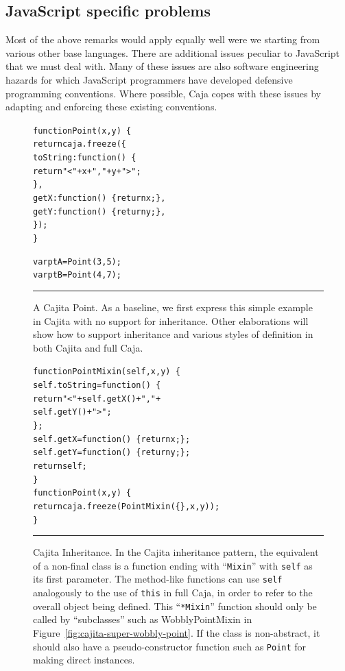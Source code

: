 \documentclass[letterpaper,twocolumn,10pt]{article}
\newcommand{\code}[1]{{\tt {#1}}}              %
\begin{document}
\subsection{JavaScript specific problems}
\label{subsec:js-probs}

Most of the above remarks would apply equally well were we starting from 
various other base languages. There are additional issues peculiar to 
JavaScript that we must deal with. Many of these issues are also software 
engineering hazards for which JavaScript programmers have developed 
defensive programming conventions. Where possible, Caja copes with these 
issues by adapting and enforcing these existing conventions.

\begin{figure}[t!]
\begin{alltt}
function Point(x, y)\ \{
  return caja.freeze(\{
    toString: function()\ \{ 
      return "<" + x + "," + y + ">"; 
    \},
    getX: function()\ \{ return x; \},
    getY: function()\ \{ return y; \},
  \});
\}

var ptA = Point(3, 5);
var ptB = Point(4, 7);
\end{alltt}

\caption[A Cajita Point.]{A Cajita Point. As a baseline, we first express 
this simple example in Cajita with no support for inheritance. Other 
elaborations will show how to support inheritance and various styles of 
definition in both Cajita and full Caja. 
\\ } \hrule
\label{fig:cajita-point}
\end{figure}

\begin{figure}[t!]
\begin{alltt}
function PointMixin(self, x, y)\ \{
  self.toString = function()\ \{ 
    return "<" + self.getX() + "," + 
                 self.getY() + ">"; 
  \};
  self.getX = function()\ \{ return x; \};
  self.getY = function()\ \{ return y; \};
  return self;
\}
function Point(x, y)\ \{
  return caja.freeze(PointMixin(\{\}, x, y));
\}
\end{alltt}

\caption[Cajita Inheritance.]{Cajita Inheritance. In the Cajita inheritance 
pattern, the equivalent of a non-final class is a function ending with 
``\code{Mixin}'' with \code{self} as its first parameter. The method-like 
functions can use \code{self} analogously to the use of \code{this} in full 
Caja, in order to refer to the overall object being defined. This 
``\code{*Mixin}'' function should only be called by ``subclasses'' such as 
WobblyPointMixin in Figure~\ref{fig:cajita-super-wobbly-point}. If the class is non-abstract, it should also have a 
pseudo-constructor function such as \code{Point} for making direct 
instances. \\ } \hrule
\label{fig:cajita-super-point}
\end{figure}
\end{document}
